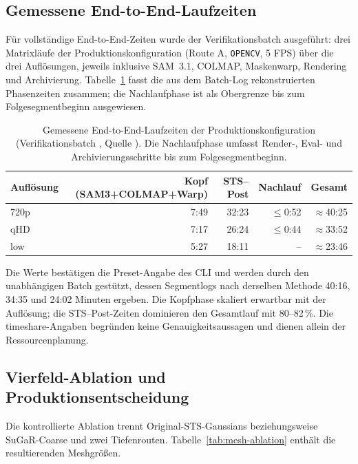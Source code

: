 \subsection{Gemessene End-to-End-Laufzeiten}
\label{sec:laufzeiten-e2e}

Für vollständige End-to-End-Zeiten wurde der Verifikationsbatch
 ausgeführt: drei Matrixläufe der
Produktionskonfiguration (Route A, \texttt{OPENCV}, 5 FPS) über die drei
Auflösungen, jeweils inklusive SAM~3.1, COLMAP, Maskenwarp, Rendering und
Archivierung. Tabelle~\ref{tab:e2e-laufzeiten} fasst die aus dem Batch-Log
rekonstruierten Phasenzeiten zusammen; die Nachlaufphase ist als Obergrenze bis
zum Folgesegmentbeginn ausgewiesen.

\begin{table}[H]
\centering
\small
\begin{tabularx}{\textwidth}{lrrrr}
\toprule
Auflösung & Kopf (SAM3+COLMAP+Warp) & STS--Post & Nachlauf & Gesamt\\
\midrule
720p & 7:49 & 32:23 & $\le$0:52 & $\approx$40:25\\
qHD  & 7:17 & 26:24 & $\le$0:44 & $\approx$33:52\\
low  & 5:27 & 18:11 & --        & $\approx$23:46\\
\bottomrule
\end{tabularx}
\caption{Gemessene End-to-End-Laufzeiten der Produktionskonfiguration
(Verifikationsbatch , Quelle
). Die Nachlaufphase umfasst Render-, Eval- und
Archivierungsschritte bis zum Folgesegmentbeginn.}
\label{tab:e2e-laufzeiten}
\end{table}

Die Werte bestätigen die Preset-Angabe des CLI und werden durch den
unabhängigen Batch  gestützt, dessen
Segmentlogs nach derselben Methode 40:16, 34:35 und 24:02 Minuten ergeben. Die
Kopfphase skaliert erwartbar mit der Auflösung; die STS--Post-Zeiten dominieren
den Gesamtlauf mit 80--82\,\%. Die timeshare-Angaben begründen keine
Genauigkeitsaussagen und dienen allein der Ressourcenplanung.

\subsection{Vierfeld-Ablation und Produktionsentscheidung}

Die kontrollierte Ablation trennt Original-STS-Gaussians beziehungsweise
SuGaR-Coarse und zwei Tiefenrouten. Tabelle~\ref{tab:mesh-ablation} enthält die
resultierenden Meshgrößen.

